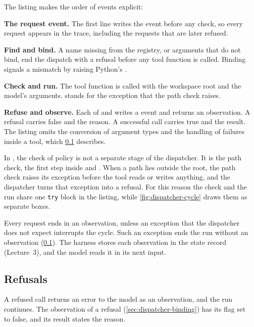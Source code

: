 The listing makes the order of events explicit:
\bi
\item \textbf{The request event.} The first line writes the  event before any
check, so every request appears in the trace, including the requests that are later refused.
\item \textbf{Find and bind.} A name missing from the registry, or arguments that do not bind, end
the dispatch with a refusal before any tool function is called. Binding signals a mismatch by
raising Python's .
\item \textbf{Check and run.} The tool function is called with the workspace root and the model's
arguments.  stands for the exception that the path check raises.
\item \textbf{Refuse and observe.} Each of  and  writes a
 event and returns an observation. A refusal carries  false and the
reason. A successful call carries  true and the result.
\ei
The listing omits the conversion of argument types and the handling of failures inside a tool,
which \cref{sec:dispatcher-refusals} describes.

In \msa{}, the check of policy is not a separate stage of the dispatcher. It is the path check, the
first step inside  and . When a path lies outside the root, the
path check raises its exception before the tool reads or writes anything, and the dispatcher turns
that exception into a refusal. For this reason the check and the run share one \texttt{try} block
in the listing, while \cref{fig:dispatcher-cycle} draws them as separate boxes.

Every request ends in an observation, unless an exception that the dispatcher does not expect
interrupts the cycle. Such an exception ends the run without an observation
(\cref{sec:dispatcher-refusals}). The harness stores each observation in the state record
(Lecture~3), and the model reads it in its next input.

\subsection{Refusals}
\label{sec:dispatcher-refusals}

A refused call returns an error to the model as an observation, and the run continues. The
observation of a refusal (\cref{sec:dispatcher-binding}) has its  flag set to false,
and its result states the reason.

